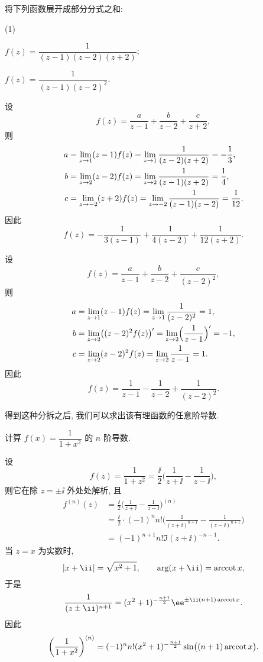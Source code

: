 \begin{example}
  将下列函数展开成部分分式之和:\smallskip
  \begin{subexample}(1)
    \item $f(z)=\dfrac1{(z-1)(z-2)(z+2)}$;\smallskip
    \item $f(z)=\dfrac{1}{(z-1)(z-2)^2}$.
  \end{subexample}
\end{example}

\begin{solutionenum}
  \item 设
  \[
    f(z)=\frac{a}{z-1}+\frac{b}{z-2}+\frac{c}{z+2},
  \]
  则
  \begin{align*}
    a&=\lim_{z\rightarrow1} (z-1)f(z)
      =\lim_{z\rightarrow1} \frac{1}{(z-2)(z+2)}
      =-\frac13,\\
    b&=\lim_{z\rightarrow2} (z-2)f(z)
      =\lim_{z\rightarrow2} \frac{1}{(z-1)(z+2)}
      =\frac14,\\
    c&=\lim_{z\rightarrow-2} (z+2)f(z)
      =\lim_{z\rightarrow-2} \frac{1}{(z-1)(z-2)}
      =\frac1{12}.
  \end{align*}
  因此
  \[
    f(z)=-\frac{1}{3(z-1)}+\frac{1}{4(z-2)}+\frac{1}{12(z+2)}.
  \]
  \item 设
  \[
    f(z)=\frac{a}{z-1}+\frac{b}{z-2}+\frac{c}{(z-2)^2},
  \]
  则
  \begin{align*}
    a&=\lim_{z\rightarrow1} (z-1)f(z)
      =\lim_{z\rightarrow1} \frac{1}{(z-2)^2}
      =1,\\
    b&=\lim_{z\rightarrow2} \bigl((z-2)^2f(z)\bigr)'
      =\lim_{z\rightarrow2} \Bigl(\frac{1}{z-1}\Bigr)'
      =-1,\\
    c&=\lim_{z\rightarrow2} (z-2)^2f(z)
      =\lim_{z\rightarrow2} \frac{1}{z-1}
      =1.
  \end{align*}
  因此
  \[
    f(z)=\frac{1}{z-1}-\frac{1}{z-2}+\frac{1}{(z-2)^2}.
  \]
\end{solutionenum}

得到这种分拆之后, 我们可以求出该有理函数的任意阶导数.

\begin{example}
  计算 $f(x)=\dfrac1{1+x^2}$ 的 $n$ 阶导数.
\end{example}

\begin{solution}
  设
  \[
     f(z)
    =\dfrac1{1+z^2}
    =\frac \ii2\biggl(\frac1{z+\ii}-\frac1{z-\ii}\biggr),
  \]
  则它在除 $z=\pm \ii$ 外处处解析, 且
  \begin{align*}
     f^{(n)}(z)&
    =\frac \ii2\biggl(\frac1{z+\ii}-\frac1{z-\ii}\biggr)^{(n)}\\&
    =\frac \ii2\cdot(-1)^n n!\biggl(\frac1{(z+\ii)^{n+1}}
      -\frac1{(z-\ii)^{n+1}}\biggr)\\&
    =(-1)^{n+1}n!\Im{(z+\ii)^{-n-1}}.
  \end{align*}
  当 $z=x$ 为实数时,
  \[
    |x+\ii|=\sqrt{x^2+1},\qquad
    \arg(x+\ii)=\arccot x,
  \]
  于是
  \[
    \frac1{(z\pm\ii)^{n+1}}=(x^2+1)^{-\frac{n+1}2}\ee^{\pm\ii (n+1)\arccot x}.
  \]
  因此
  \[
     \biggl(\frac1{1+x^2}\biggr)^{(n)}
    =(-1)^nn!(x^2+1)^{-\frac{n+1}2}\sin\bigl((n+1)\operatorname{arccot} x\bigr).
  \]
\end{solution}

